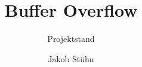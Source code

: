 \documentclass[aspectratio=169]{beamer}
\title{Buffer Overflow}
\subtitle{Projektstand}
\author{Jakob Stühn}
\institute{H-BRS}
\begin{document}
\frame{\titlepage}



\end{document}
